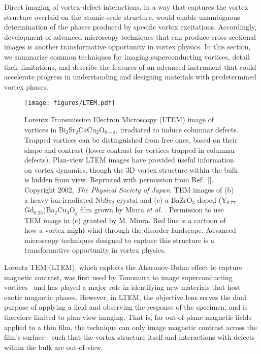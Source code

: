 \documentclass[%
 aip,
 amsmath,amssymb,
 reprint,%
floatfix]{revtex4-1}
\begin{document}
Direct imaging of vortex-defect interactions, in a way that captures the vortex structure overlaid on the atomic-scale structure, would enable unambiguous determination of the phases produced by specific vortex excitations. Accordingly, development of advanced microscopy techniques that can produce cross sectional images is another transformative opportunity in vortex physics.  In this section, we summarize common techniques for imaging superconducting vortices, detail their limitations, and describe the features of an advanced instrument that could accelerate progress in understanding and designing materials with predetermined vortex phases.



\begin{figure}
\texttt{[image: figures/LTEM.pdf]}
\caption{Lorentz Transmission Electron Microscopy (LTEM) image of vortices in Bi$_2$Sr$_2$CaCu$_2$O$_{8+\delta}$, irradiated to induce columnar defects. Trapped vortices can be distinguished from free ones, based on their shape and contrast (lower contrast for vortices trapped in columnar defects). Plan-view LTEM images have provided useful information on vortex dynamics, though the 3D vortex structure within the bulk is hidden from view. Reprinted with permission from Ref.~[].  Copyright 2002, \emph{The Physical Society of Japan}. TEM images of (b) a heavy-ion-irradiated NbSe$_2$ crystal\cite{Eley2018} and (c) a BaZrO$_3$-doped (Y$_{0.77}$Gd$_{0.23}$)Ba$_2$Cu$_3$O$_y$ film grown by Miura \textit{et al.} \cite{Miura2013k}. Permission to use TEM image in (c) granted by M. Miura.  Red line is a cartoon of how a vortex might wind through the disorder landscape. Advanced microscopy techniques designed to capture this structure is a transformative opportunity in vortex physics. \label{fig:vortexstructuresTEM}}
\end{figure}



Lorentz TEM (LTEM), which exploits the Aharonov-Bohm effect to capture magnetic contrast, was first used by Tonomura to image superconducting vortices~\cite{Tonomura2006} and has played a major role in identifying new materials that host exotic magnetic phases.  However, in LTEM, the objective lens serves the dual purpose of applying a field and observing the response of the specimen, and is therefore limited to plan-view imaging. That is, for out-of-plane magnetic fields applied to a thin film, the technique can only image magnetic contrast across the film’s surface---such that the vortex structure itself and interactions with defects within the bulk are out-of-view.
\end{document}

